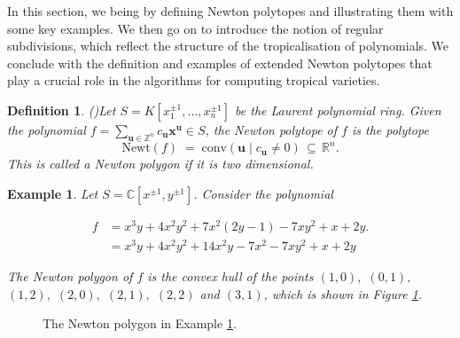 \documentclass[11pt,reqno,a4paper]{article}
\theoremstyle{theoremstyle}
\theoremstyle{examplestyle}
\newtheorem{example}[theorem]{Example}
\newtheorem{definition}[theorem]{Definition}
\theoremstyle{algorithmstyle}
\numberwithin{equation}{subsection}
\newcommand{\RR}{\mathbb{R}}
\newcommand{\ZZ}{\mathbb{Z}}
\newcommand{\CC}{\mathbb{C}}
\begin{document}
In this section, we being by defining Newton polytopes and illustrating them with some key examples. We then go on to introduce the notion of regular subdivisions, which reflect the structure of the tropicalisation of polynomials. We conclude with the definition and examples of extended Newton polytopes that play a crucial role in the algorithms for computing tropical varieties. 


\begin{definition}
    (\cite[Def. 2.3.4]{MS2015})Let $S = K[x_1^{\pm1},\ldots,x_n^{\pm1}]$ be the Laurent polynomial ring. Given the polynomial $f=\sum_{\mathbf{u}\in\ZZ^n}c_{\mathbf{u}}\mathbf{x}^\mathbf{u}\in S$, the \textit{Newton polytope} of $f$ is the polytope \[\text{Newt}(f) \; = \; \text{conv}(\mathbf{u} \; | \;c_{\mathbf{u}} \neq 0) \, \subseteq \, \RR^n.\]
    This is called a Newton polygon if it is two dimensional.
\end{definition}

\begin{example}
\label{ex:NewtPoly}
    Let $S=\CC[x^{\pm1},y^{\pm1}]$. Consider the polynomial
    
    \[\begin{aligned}
    f &= x^3y + 4x^2y^2 +7x^2(2y - 1) - 7xy^2 + x +2y.\\
      &= x^3y + 4x^2y^2 +14x^2y - 7x^2 - 7xy^2 + x +2y     
    \end{aligned}\]
    
    
    The Newton polygon of $f$ is the convex hull of the points $(1,0),$ $(0,1),$ $(1,2),$ $(2,0),$ $(2,1),$ $(2,2)$ and $(3,1)$, which is shown in Figure \ref{fig:Newtpolygonex}.
\end{example}

\begin{figure}[h]
\centering
{}
\caption{The Newton polygon in Example \ref{ex:NewtPoly}.}
\label{fig:Newtpolygonex}
\end{figure}
\end{document}

